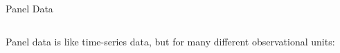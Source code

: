 \documentclass[aspectratio=169,t,11pt,table]{beamer}
\begin{document}
\begin{frame}{Panel Data}
  \begin{columns}[T]
    \begin{column}{.4\textwidth}
      \alert{Panel data} is like time-series data, but for many different observational units:
    \end{column}
    \begin{column}{.6\textwidth}
      \vspace*{-\bigskipamount}
      
    \end{column}
  \end{columns}
\end{frame}
\end{document}
